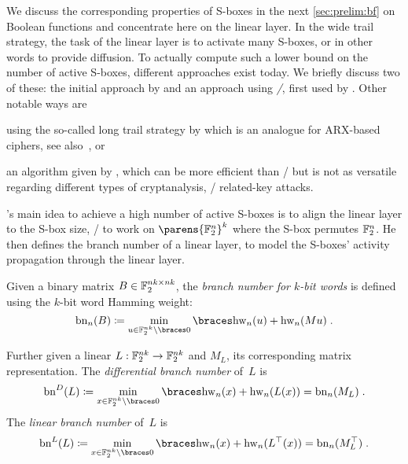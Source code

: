 We discuss the corresponding properties of S-boxes in the next \cref{sec:prelim:bf} on Boolean functions and concentrate here on the linear layer.
In the wide trail strategy, the task of the linear layer is to activate many S-boxes, or in other words to provide diffusion.
To actually compute such a lower bound on the number of active S-boxes, different approaches exist today.
We briefly discuss two of these: the initial approach by \textcite{PhD:Daemen95} and an approach using \emph{\MILPp/}, first used by \textcite{Inscrypt:MWGP11}.
Other notable ways are \begin{inparaenum}
    \item using the so-called long trail strategy by \textcite{AC:DPUVGB16} which is an analogue for ARX-based ciphers, see also~\cite[Chapter~6]{PhD:Perrin17}, or
    \item an algorithm given by \textcite[Section~4]{EC:Matsui94}, which can be more efficient than \MILPp/ but is not as versatile regarding different types of cryptanalysis, \eg/ related-key attacks.
\end{inparaenum}

\citeauthor{PhD:Daemen95}'s main idea to achieve a high number of active S-boxes is to align the linear layer to the S-box size, \ie/ to work on $\parens{\F_2^n}^k$ where the S-box permutes $\mathbb{F}_2^n$.
He then defines the branch number of a linear layer, to model the S-boxes' activity propagation through the linear layer.
\begin{definition}
    Given a binary matrix $B \in \mathbb{F}_2^{nk \times nk}$, the \emph{branch number for $k$-bit words} is defined using the $k$-bit word Hamming weight:
    \begin{equation*}
        \mathrm{bn}_n(B) \coloneqq \min_{u \in \F_2^{nk} \setminus \set{0}}\set{\mathrm{hw}_n(u)+\mathrm{hw}_n(Mu)}\;.
    \end{equation*}

    Further given a linear $L : \mathbb{F}_2^{nk} \to \mathbb{F}_2^{nk}$ and $M_L$, its corresponding matrix representation.
    The \emph{differential branch number} of~$L$ is
    \begin{equation*}
        \mathrm{bn}^D(L) \coloneqq \min_{x \in \F_2^{nk} \setminus \set{0}} \set{\mathrm{hw}_n(x) + \mathrm{hw}_n(L(x))} = \mathrm{bn}_n(M_L)\;.
    \end{equation*}
    The \emph{linear branch number} of~$L$ is
    \begin{equation*}
        \mathrm{bn}^L(L) \coloneqq \min_{x \in \F_2^{nk} \setminus \set{0}} \set{\mathrm{hw}_n(x) + \mathrm{hw}_n(L^\top(x))} = \mathrm{bn}_n(M_L^\top)\;.
    \end{equation*}
\end{definition}

